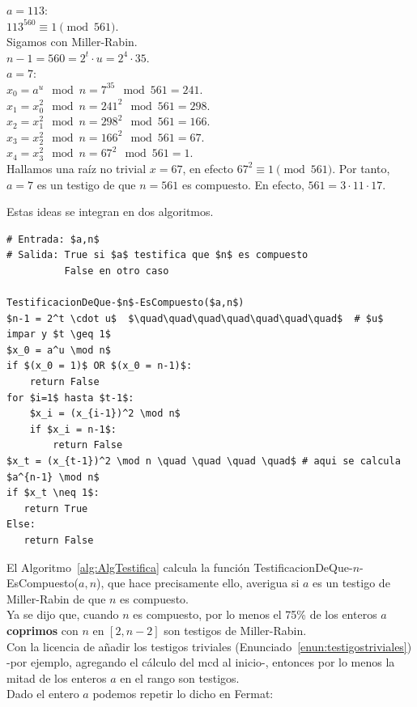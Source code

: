 \begin{ejemplo}
$a=113$: \\
$113^{560} \equiv 1 \pmod {561}$. \\
Sigamos con Miller-Rabin. \\
$n-1 = 560 = 2^t \cdot u = 2^4 \cdot 35$. \\
$a=7$: \\
$x_0 = a^{u} \mod n =7^{35} \mod 561 = 241$. \\
$x_1 = x_0^2 \mod n = 241^2 \mod 561 = 298$. \\
$x_2 = x_1^2 \mod n = 298^2 \mod 561 = 166$. \\
$x_3 = x_2^2 \mod n = 166^2 \mod 561 = 67$. \\
$x_4 = x_3^2 \mod n = 67^2 \mod 561 = 1$. \\
Hallamos una raíz no trivial $x=67$, en efecto $67^2 \equiv 1 \pmod {561}$.  Por tanto, $a=7$ es un testigo de que $n=561$ es compuesto. En efecto, $561 = 3 \cdot 11 \cdot 17$.
\end{ejemplo}

Estas ideas se integran en dos algoritmos. 

\begin{lstlisting}[caption={Verifica si $a$ atestigua que $n$ es compuesto}, label={alg:AlgTestifica}, mathescape=true]
# Entrada: $a,n$
# Salida: True si $a$ testifica que $n$ es compuesto
          False en otro caso 
          
TestificacionDeQue-$n$-EsCompuesto($a,n$)
$n-1 = 2^t \cdot u$  $\quad\quad\quad\quad\quad\quad\quad$  # $u$ impar y $t \geq 1$
$x_0 = a^u \mod n$
if $(x_0 = 1)$ OR $(x_0 = n-1)$:
    return False
for $i=1$ hasta $t-1$:
    $x_i = (x_{i-1})^2 \mod n$
    if $x_i = n-1$: 
        return False
$x_t = (x_{t-1})^2 \mod n \quad \quad \quad \quad$ # aqui se calcula $a^{n-1} \mod n$
if $x_t \neq 1$:
   return True  
Else:
   return False
\end{lstlisting}

El Algoritmo~\ref{alg:AlgTestifica} calcula la función TestificacionDeQue-$n$-EsCompuesto($a,n$), que hace precisamente ello, averigua si $a$ es un testigo de Miller-Rabin de que $n$ es compuesto. \\

Ya se dijo que, cuando $n$ es compuesto, por lo menos el 75\% de los enteros $a$ \textbf{coprimos} con $n$ en $[2, n-2]$ son testigos de Miller-Rabin. \\
Con la licencia de añadir los testigos triviales (Enunciado~\ref{enun:testigostriviales}) -por ejemplo, agregando el cálculo del mcd al inicio-, entonces por lo menos la mitad de los enteros $a$ en el rango son testigos. \\
Dado el entero $a$ podemos repetir lo dicho en Fermat: \\

